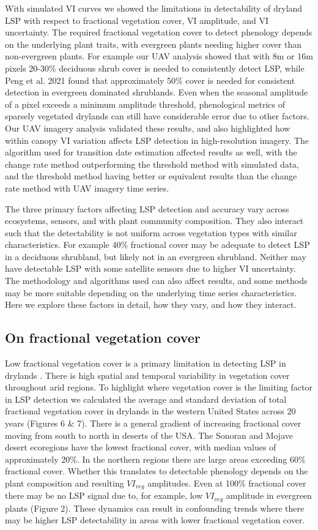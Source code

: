 \documentclass{article}
\begin{document}
With simulated VI curves we showed the limitations in detectability of dryland LSP with respect to fractional vegetation cover, VI amplitude, and VI uncertainty. The required fractional vegetation cover to detect phenology depends on the underlying plant traits, with evergreen plants needing higher cover than non-evergreen plants. For example our UAV analysis showed that with 8m or 16m pixels 20-30\% deciduous shrub cover is needed to consistently detect LSP, while Peng et al. 2021 \cite{peng2021} found that approximately 50\% cover is needed for consistent detection in evergreen dominated shrublands. Even when the seasonal amplitude of a pixel exceeds a minimum amplitude threshold, phenological metrics of sparsely vegetated drylands can still have considerable error due to other factors.  Our UAV imagery analysis validated these results, and also highlighted how within canopy VI variation affects LSP detection in high-resolution imagery. The algorithm used for transition date estimation affected results as well, with the change rate method outperforming the threshold method with simulated data, and the threshold method having better or equivalent results than the change rate method with UAV imagery time series. 

The three primary factors affecting LSP detection and accuracy vary across ecosystems, sensors, and with plant community composition. They also interact such that the detectability is not uniform across vegetation types with similar characteristics. For example 40\% fractional cover may be adequate to detect LSP in a deciduous shrubland, but likely not in an evergreen shrubland. Neither may have detectable LSP with some satellite sensors due to higher VI uncertainty. The methodology and algorithms used can also affect results, and some methods may be more suitable depending on the underlying time series characteristics. Here we explore these factors in detail, how they vary, and how they interact. 

\subsection{On fractional vegetation cover}
Low fractional vegetation cover is a primary limitation in detecting LSP in drylands \cite{smith2019}. There is high spatial and temporal variability in vegetation cover throughout arid regions. To highlight where vegetation cover is the limiting factor in LSP detection we calculated the average and standard deviation of total fractional vegetation cover in drylands in the western United States across 20 years (Figures 6 \& 7). There is a general gradient of increasing fractional cover moving from south to north in deserts of the USA. The Sonoran and Mojave desert ecoregions have the lowest fractional cover, with median values of approximately 20\%. In the northern regions there are large areas exceeding 60\% fractional cover. Whether this translates to detectable phenology depends on the plant composition and resulting $VI_{veg}$ amplitudes. Even at 100\% fractional cover there may be no LSP signal due to, for example, low $VI_{veg}$ amplitude in evergreen plants (Figure 2). These dynamics can result in confounding trends where there may be higher LSP detectability in areas with lower fractional vegetation cover.
\end{document}
